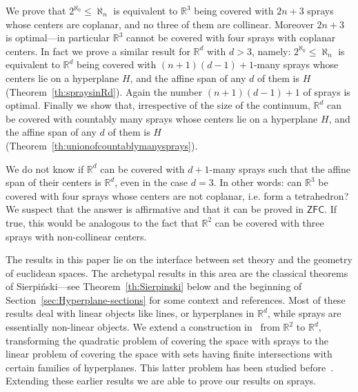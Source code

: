 \documentclass[12pt]{amsart}
\newcommand{\R}{\mathbb{R}}	%
\newcommand{\ZFC}{\mathsf{ZFC}}		%
\theoremstyle{plain}
\theoremstyle{definition}
\theoremstyle{remark}
\begin{document}
We prove that \( 2^{\aleph_0} \leq \aleph_n \) is equivalent to \( \R^3 \) being covered with \( 2 n + 3 \) sprays whose centers are coplanar, and no three of them are collinear.
Moreover \( 2 n + 3 \) is optimal---in particular \( \R^3 \) cannot be covered with four sprays with coplanar centers.
In fact we prove a similar result for \( \R^d \) with \( d > 3 \), namely: \( 2^{\aleph_0} \leq \aleph_n \) is equivalent to \( \R^d \) being covered with \( ( n + 1 ) ( d - 1 ) + 1 \)-many sprays whose centers lie on a hyperplane \( H \), and the affine span of any \( d \) of them is \( H \) (Theorem~\ref{th:spraysinRd}).
Again the number \( ( n + 1 ) ( d - 1 ) + 1 \) of sprays is optimal.
Finally we show that, irrespective of the size of the continuum, \( \R^d \) can be covered with countably many sprays whose centers lie on a hyperplane \( H \), and the affine span of any \( d \) of them is \( H \) (Theorem~\ref{th:unionofcountablymanysprays}).

We do not know if \( \R^d \) can be covered with \( d + 1 \)-many sprays such that the affine span of their centers is \( \R^d \), even in the case \( d = 3 \).
In other words: can \( \R^3 \) be covered with four sprays whose centers are not coplanar, i.e. form a tetrahedron?
We suspect that the answer is affirmative and that it can be proved in \( \ZFC \).
If true, this would be analogous to the fact that \( \R^2 \) can be covered with three sprays with non-collinear centers.

The results in this paper lie on the interface between set theory and the geometry of euclidean spaces.
The archetypal results in this area are the classical theorems of Sierpiński---see Theorem~\ref{th:Sierpinski} below and the beginning of Section~\ref{sec:Hyperplane-sections} for some context and references.
Most of these results deal with linear objects like lines, or hyperplanes in \( \R^d \), while sprays are essentially non-linear objects.
We extend a construction in~\cite{Schmerl:2010nr} from \( \R^2 \) to \( \R^d \), transforming the quadratic problem of covering the space with sprays to the linear problem of covering the space with sets having finite intersections with certain families of hyperplanes.
This latter problem has been studied before~\cite{Bagemihl:1959te,Erdos:1994yq,Simms:1997aa}.
Extending these earlier results we are able to prove our results on sprays.
 
\end{document}
